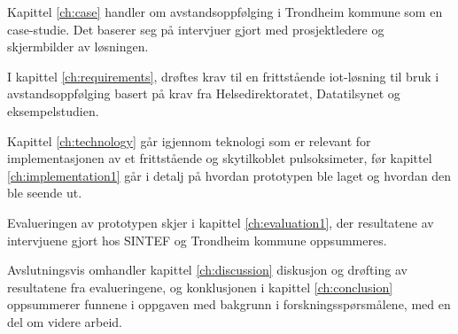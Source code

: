 Kapittel \ref{ch:case} handler om avstandsoppfølging i Trondheim kommune som en case-studie. Det baserer seg på intervjuer gjort med
prosjektledere og skjermbilder av løsningen.

I kapittel \ref{ch:requirements}, drøftes krav til en frittstående \gls{iot}-løsning til bruk i avstandsoppfølging basert på krav fra Helsedirektoratet,
Datatilsynet og eksempelstudien.

Kapittel \ref{ch:technology} går igjennom teknologi som er relevant for implementasjonen av et frittstående og skytilkoblet pulsoksimeter,
før kapittel \ref{ch:implementation1} går i detalj på hvordan prototypen ble laget og hvordan den ble seende ut.

Evalueringen av prototypen skjer i kapittel \ref{ch:evaluation1}, der resultatene av intervjuene gjort hos SINTEF og Trondheim kommune oppsummeres.

Avslutningsvis omhandler kapittel \ref{ch:discussion} diskusjon og drøfting av resultatene fra evalueringene, og konklusjonen i kapittel \ref{ch:conclusion}
oppsummerer funnene i oppgaven med bakgrunn i forskningsspørsmålene, med en del om videre arbeid.
